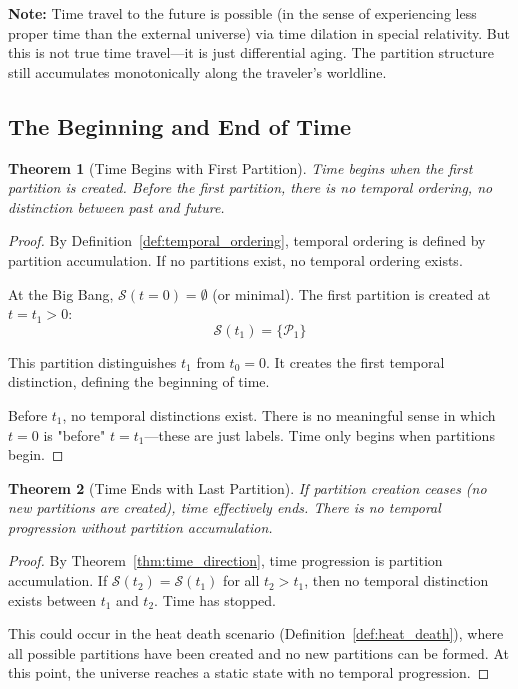 \documentclass[twocolumn,10pt]{article}
\newtheorem{theorem}{Theorem}[section]
\theoremstyle{definition}
\theoremstyle{remark}
\begin{document}
\noindent\textbf{Note:} Time travel to the future is possible (in the sense of experiencing less proper time than the external universe) via time dilation in special relativity. But this is not true time travel—it is just differential aging. The partition structure still accumulates monotonically along the traveler's worldline.

\subsection{The Beginning and End of Time}

\begin{theorem}[Time Begins with First Partition]
\label{thm:time_begins}
Time begins when the first partition is created. Before the first partition, there is no temporal ordering, no distinction between past and future.
\end{theorem}

\begin{proof}
By Definition~\ref{def:temporal_ordering}, temporal ordering is defined by partition accumulation. If no partitions exist, no temporal ordering exists.

At the Big Bang, $\mathcal{S}(t=0) = \emptyset$ (or minimal). The first partition is created at $t = t_1 > 0$:
\begin{equation}
\mathcal{S}(t_1) = \{\mathcal{P}_1\}
\end{equation}

This partition distinguishes $t_1$ from $t_0 = 0$. It creates the first temporal distinction, defining the beginning of time.

Before $t_1$, no temporal distinctions exist. There is no meaningful sense in which $t = 0$ is "before" $t = t_1$—these are just labels. Time only begins when partitions begin.
\end{proof}

\begin{theorem}[Time Ends with Last Partition]
\label{thm:time_ends}
If partition creation ceases (no new partitions are created), time effectively ends. There is no temporal progression without partition accumulation.
\end{theorem}

\begin{proof}
By Theorem~\ref{thm:time_direction}, time progression is partition accumulation. If $\mathcal{S}(t_2) = \mathcal{S}(t_1)$ for all $t_2 > t_1$, then no temporal distinction exists between $t_1$ and $t_2$. Time has stopped.

This could occur in the heat death scenario (Definition~\ref{def:heat_death}), where all possible partitions have been created and no new partitions can be formed. At this point, the universe reaches a static state with no temporal progression.
\end{proof}
\end{document}
